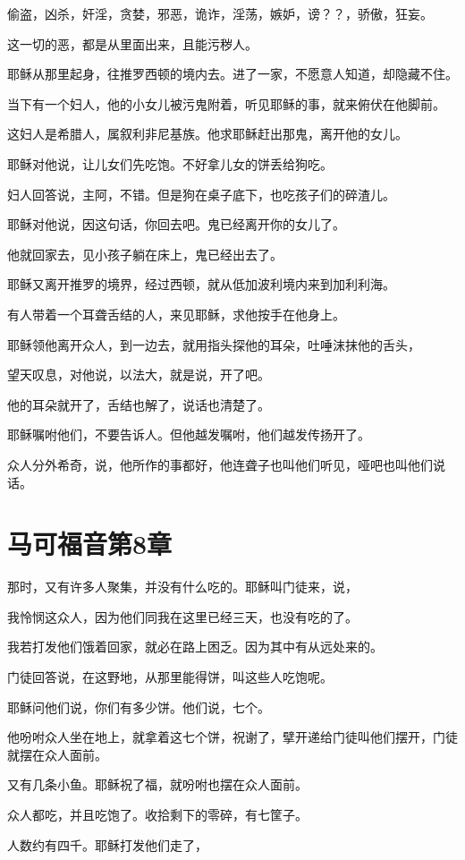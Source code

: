 \documentclass[12pt,oneside]{book}
\begin{document}
偷盗，凶杀，奸淫，贪婪，邪恶，诡诈，淫荡，嫉妒，谤？？，骄傲，狂妄。

这一切的恶，都是从里面出来，且能污秽人。

耶稣从那里起身，往推罗西顿的境内去。进了一家，不愿意人知道，却隐藏不住。

当下有一个妇人，他的小女儿被污鬼附着，听见耶稣的事，就来俯伏在他脚前。

这妇人是希腊人，属叙利非尼基族。他求耶稣赶出那鬼，离开他的女儿。

耶稣对他说，让儿女们先吃饱。不好拿儿女的饼丢给狗吃。

妇人回答说，主阿，不错。但是狗在桌子底下，也吃孩子们的碎渣儿。

耶稣对他说，因这句话，你回去吧。鬼已经离开你的女儿了。

他就回家去，见小孩子躺在床上，鬼已经出去了。

耶稣又离开推罗的境界，经过西顿，就从低加波利境内来到加利利海。

有人带着一个耳聋舌结的人，来见耶稣，求他按手在他身上。

耶稣领他离开众人，到一边去，就用指头探他的耳朵，吐唾沫抹他的舌头，

望天叹息，对他说，以法大，就是说，开了吧。

他的耳朵就开了，舌结也解了，说话也清楚了。

耶稣嘱咐他们，不要告诉人。但他越发嘱咐，他们越发传扬开了。

众人分外希奇，说，他所作的事都好，他连聋子也叫他们听见，哑吧也叫他们说话。

\chapter{马可福音第8章}
那时，又有许多人聚集，并没有什么吃的。耶稣叫门徒来，说，

我怜悯这众人，因为他们同我在这里已经三天，也没有吃的了。

我若打发他们饿着回家，就必在路上困乏。因为其中有从远处来的。

门徒回答说，在这野地，从那里能得饼，叫这些人吃饱呢。

耶稣问他们说，你们有多少饼。他们说，七个。

他吩咐众人坐在地上，就拿着这七个饼，祝谢了，擘开递给门徒叫他们摆开，门徒就摆在众人面前。

又有几条小鱼。耶稣祝了福，就吩咐也摆在众人面前。

众人都吃，并且吃饱了。收拾剩下的零碎，有七筐子。

人数约有四千。耶稣打发他们走了，
\end{document}
